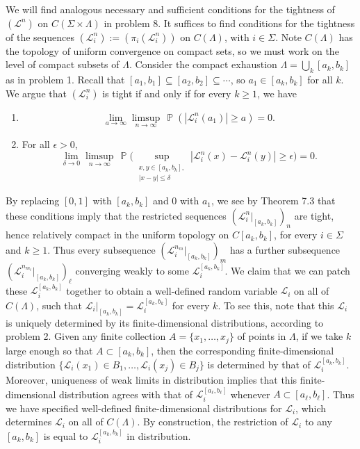 \documentclass[12pt]{article}
\DeclareMathOperator{\pr}{\mathbb{P}}
\begin{document}
		We will find analogous necessary and sufficient conditions for the tightness of $(\mathcal{L}^n)$ on $C(\Sigma\times\Lambda)$ in problem 8. It suffices to find conditions for the tightness of the sequences $(\mathcal{L}^n_i) := (\pi_i(\mathcal{L}^n_i))$ on $C(\Lambda)$, with $i\in\Sigma$. Note $C(\Lambda)$ has the topology of uniform convergence on compact sets, so we must work on the level of compact subsets of $\Lambda$. Consider the compact exhaustion $\Lambda = \bigcup_k [a_k,b_k]$ as in problem 1. Recall that $[a_1,b_1]\subseteq [a_2,b_2]\subseteq\cdots$, so $a_1\in [a_k,b_k]$ for all $k$. We argue that $(\mathcal{L}^n_i)$ is tight if and only if for every $k\geq 1$, we have
		\begin{enumerate}[label=(\roman*)]
			
			\item 
			\[
			\lim_{a\to\infty} \limsup_{n\to\infty}\, \pr(|\mathcal{L}^n_i(a_1)|\geq a) = 0.
			\]
			
			\item For all $\epsilon>0$,
			\[
			\lim_{\delta\to 0} \limsup_{n\to\infty}\, \pr\bigg(\sup_{\substack{x,y\in [a_k,b_k], \\ |x-y|\leq\delta}} |\mathcal{L}^n_i(x) - \mathcal{L}^n_i(y)| \geq \epsilon\bigg) = 0.
			\]
			
		\end{enumerate}
	
		By replacing $[0,1]$ with $[a_k,b_k]$ and 0 with $a_1$, we see by Theorem 7.3 that these conditions imply that the restricted sequences $(\mathcal{L}^n_i|_{[a_k,b_k]})_n$ are tight, hence relatively compact in the uniform topology on $C[a_k,b_k]$, for every $i\in\Sigma$ and $k\geq 1$. Thus every subsequence $(\mathcal{L}^{n_m}_i|_{[a_k,b_k]})_m$ has a further subsequence $(\mathcal{L}^{n_{m_\ell}}_i|_{[a_k,b_k]})_\ell$ converging weakly to some $\mathcal{L}_i^{[a_k,b_k]}$. We claim that we can patch these $\mathcal{L}_i^{[a_k,b_k]}$ together to obtain a well-defined random variable $\mathcal{L}_i$ on all of $C(\Lambda)$, such that $\mathcal{L}_i|_{[a_k,b_k]} = \mathcal{L}_i^{[a_k,b_k]}$ for every $k$. To see this, note that this $\mathcal{L}_i$ is uniquely determined by its finite-dimensional distributions, according to problem 2. Given any finite collection $A=\{x_1,\dots,x_j\}$ of points in $\Lambda$, if we take $k$ large enough so that $A \subset [a_k,b_k]$, then the corresponding finite-dimensional distribution $\{\mathcal{L}_i(x_1)\in B_1, \dots, \mathcal{L}_i(x_j) \in B_j\}$ is determined by that of $\mathcal{L}_i^{[a_k,b_k]}$. Moreover, uniqueness of weak limits in distribution implies that this finite-dimensional distribution agrees with that of $\mathcal{L}_i^{[a_\ell,b_\ell]}$ whenever $A\subset[a_\ell,b_\ell]$. Thus we have specified well-defined finite-dimensional distributions for $\mathcal{L}_i$, which determines $\mathcal{L}_i$ on all of $C(\Lambda)$. By construction, the restriction of $\mathcal{L}_i$ to any $[a_k,b_k]$ is equal to $\mathcal{L}_i^{[a_k,b_k]}$ in distribution.
		
\end{document}
